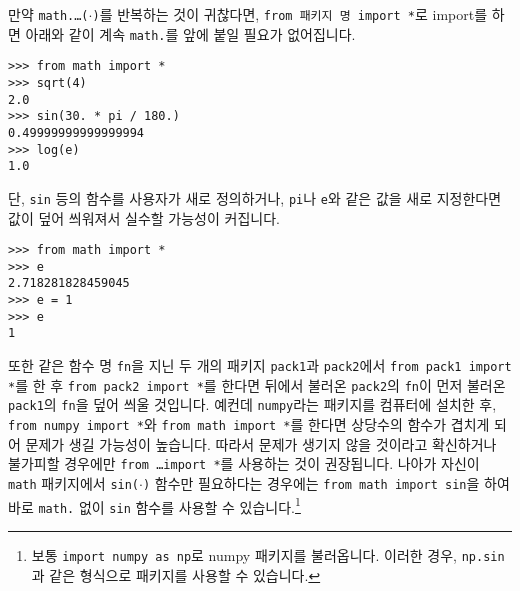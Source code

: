 \documentclass[../main.tex]{subfiles}
\begin{document}
만약 \texttt{math.\dots($\cdot$)}를 반복하는 것이 귀찮다면, \texttt{from 패키지
명 import *}로 import를 하면 아래와 같이 계속 \texttt{math.}를 앞에 붙일 필요가
없어집니다.
\begin{verbatim}
>>> from math import *
>>> sqrt(4)
2.0
>>> sin(30. * pi / 180.)
0.49999999999999994
>>> log(e)
1.0
\end{verbatim}
단, \texttt{sin} 등의 함수를 사용자가 새로 정의하거나, \texttt{pi}나 \texttt{e}와 같은 값을 새로 지정한다면 값이 덮어 씌워져서 실수할 가능성이 커집니다.
\begin{verbatim}
>>> from math import *
>>> e
2.718281828459045
>>> e = 1
>>> e
1
\end{verbatim}
또한 같은 함수 명 \texttt{fn}을 지닌 두 개의 패키지 \texttt{pack1}과
\texttt{pack2}에서 \texttt{from pack1 import *}를 한 후 \texttt{from pack2
import *}를 한다면 뒤에서 불러온 \texttt{pack2}의 \texttt{fn}이 먼저 불러온
\texttt{pack1}의 \texttt{fn}을 덮어 씌울 것입니다.  예컨데 \texttt{numpy}라는
패키지를 컴퓨터에 설치한 후, \texttt{from numpy import *}와 \texttt{from math
import *}를 한다면 상당수의 함수가 겹치게 되어 문제가 생길 가능성이 높습니다.
따라서 문제가 생기지 않을 것이라고 확신하거나 불가피할 경우에만 \texttt{from
\dots import *}를 사용하는 것이 권장됩니다.  나아가 자신이 \texttt{math}
패키지에서 \texttt{sin($\cdot$)} 함수만 필요하다는 경우에는 \texttt{from math
import sin}을 하여 바로 \texttt{math.} 없이 \texttt{sin} 함수를 사용할 수
있습니다.\footnote{보통 \texttt{import numpy as np}로 numpy 패키지를
불러옵니다. 이러한 경우, \texttt{np.sin}과 같은 형식으로 패키지를 사용할 수
있습니다.}
\end{document}
